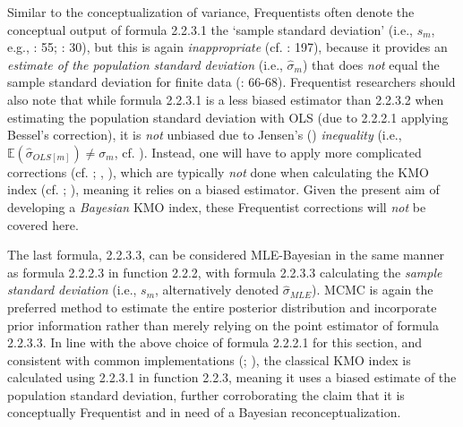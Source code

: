 \documentclass[
  10pt,
  a4paper,
  twoside]{article}
\begin{document}
Similar to the conceptualization of variance, Frequentists often denote the conceptual output of formula 2.2.3.1 the `sample standard deviation' (i.e., \(s_m\), e.g., : 55; : 30), but this is again \emph{inappropriate} (cf. : 197), because it provides an \emph{estimate of the population standard deviation} (i.e., \(\hat{\sigma}_m\)) that does \emph{not} equal the sample standard deviation for finite data (: 66-68). Frequentist researchers should also note that while formula 2.2.3.1 is a less biased estimator than 2.2.3.2 when estimating the population standard deviation with OLS (due to 2.2.2.1 applying Bessel's correction), it is \emph{not} unbiased due to Jensen's () \emph{inequality} (i.e., \(\mathbb{E}(\hat{\sigma}_{OLS[m]}) \neq \sigma_m\), cf. ). Instead, one will have to apply more complicated corrections (cf. ; , ), which are typically \emph{not} done when calculating the KMO index (cf. ; ), meaning it relies on a biased estimator. Given the present aim of developing a \emph{Bayesian} KMO index, these Frequentist corrections will \emph{not} be covered here.

The last formula, 2.2.3.3, can be considered MLE-Bayesian in the same manner as formula 2.2.2.3 in function 2.2.2, with formula 2.2.3.3 calculating the \emph{sample standard deviation} (i.e., \(s_m\), alternatively denoted \(\hat{\sigma}_{MLE}\)). MCMC is again the preferred method to estimate the entire posterior distribution and incorporate prior information rather than merely relying on the point estimator of formula 2.2.3.3. In line with the above choice of formula 2.2.2.1 for this section, and consistent with common implementations (; ), the classical KMO index is calculated using 2.2.3.1 in function 2.2.3, meaning it uses a biased estimate of the population standard deviation, further corroborating the claim that it is conceptually Frequentist and in need of a Bayesian reconceptualization.
\end{document}

